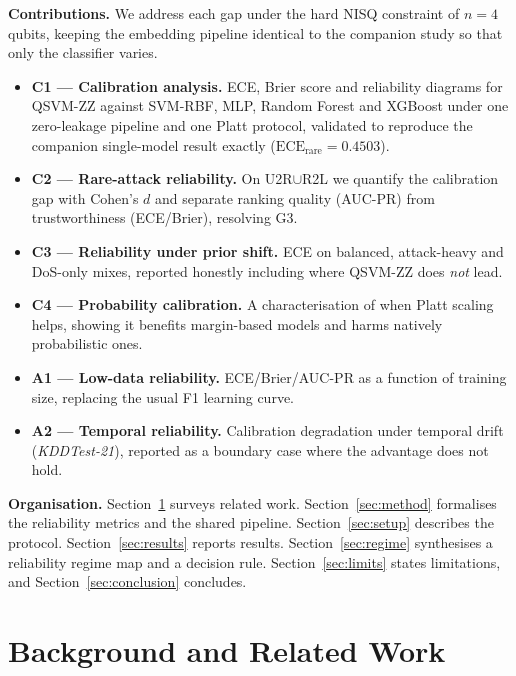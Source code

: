 \documentclass[journal]{IEEEtran}
\newcommand{\ZZ}{\textsc{ZZ}}
\newcommand{\QSVM}{QSVM-\ZZ}
\newcommand{\ECE}{\mathrm{ECE}}
\begin{document}
\textbf{Contributions.} We address each gap under the hard NISQ
constraint of $n{=}4$ qubits, keeping the embedding pipeline identical to
the companion study so that only the classifier varies.
\begin{itemize}
\item \textbf{C1 --- Calibration analysis.} ECE, Brier score and
  reliability diagrams for \QSVM{} against SVM-RBF, MLP, Random Forest
  and XGBoost under one zero-leakage pipeline and one Platt protocol,
  validated to reproduce the companion single-model result exactly
  ($\ECE_{\text{rare}}{=}0.4503$).
\item \textbf{C2 --- Rare-attack reliability.} On U2R$\cup$R2L we
  quantify the calibration gap with Cohen's $d$ and separate ranking
  quality (AUC-PR) from trustworthiness (ECE/Brier), resolving G3.
\item \textbf{C3 --- Reliability under prior shift.} ECE on balanced,
  attack-heavy and DoS-only mixes, reported honestly including where
  \QSVM{} does \emph{not} lead.
\item \textbf{C4 --- Probability calibration.} A characterisation of when
  Platt scaling helps, showing it benefits margin-based models and harms
  natively probabilistic ones.
\item \textbf{A1 --- Low-data reliability.} ECE/Brier/AUC-PR as a
  function of training size, replacing the usual F1 learning curve.
\item \textbf{A2 --- Temporal reliability.} Calibration degradation
  under temporal drift (\textit{KDDTest-21}), reported as a boundary case
  where the advantage does not hold.
\end{itemize}

\textbf{Organisation.} Section~\ref{sec:related} surveys related work.
Section~\ref{sec:method} formalises the reliability metrics and the
shared pipeline. Section~\ref{sec:setup} describes the protocol.
Section~\ref{sec:results} reports results. Section~\ref{sec:regime}
synthesises a reliability regime map and a decision rule.
Section~\ref{sec:limits} states limitations, and
Section~\ref{sec:conclusion} concludes.

\section{Background and Related Work}\label{sec:related}
\end{document}
